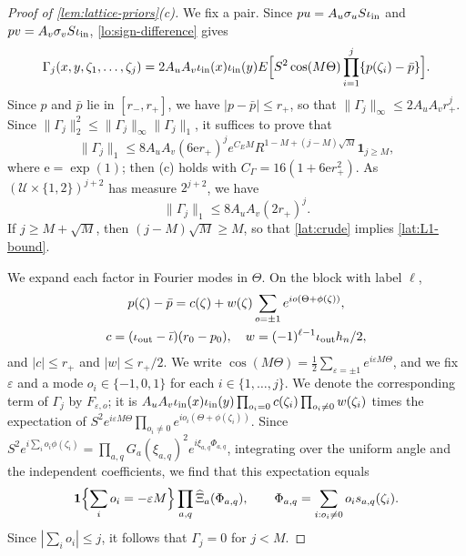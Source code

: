 \begin{proof}[Proof of \cref{lem:lattice-priors}(c)]
We fix a pair. Since $pu=A_u\sigma_uS\iota_{\rm in}$ and
$pv=A_v\sigma_vS\iota_{\rm in}$, \eqref{lo:sign-difference} gives
\[
 \Gamma_j(x,y,\zeta_1,\ldots,\zeta_j)
 =2A_uA_v\iota_{\rm in}(x)\iota_{\rm in}(y)
 E\Bigl[S^2\cos(M\Theta)\prod_{i=1}^j\{p(\zeta_i)-\bar p\}\Bigr].
\]
Since $p$ and $\bar p$ lie in $[r_-,r_+]$, we have $|p-\bar p|\le r_+$,
so that $\|\Gamma_j\|_\infty\le2A_uA_vr_+^j$. Since
$\|\Gamma_j\|_2^2\le\|\Gamma_j\|_\infty\|\Gamma_j\|_1$, it suffices to
prove that
\begin{equation}\label{lat:L1-bound}
 \|\Gamma_j\|_1\le8A_uA_v(6\mathrm er_+)^je^{C_EM}
 R^{1-M+(j-M)\sqrt M}\mathbf 1_{j\ge M},
\end{equation}
where $\mathrm e=\exp(1)$; then (c) holds with
$C_\Gamma=16(1+6\mathrm er_+^2)$. As $(\mathcal U\times\{1,2\})^{j+2}$
has measure $2^{j+2}$, we have
\begin{equation}\label{lat:crude}
 \|\Gamma_j\|_1\le8A_uA_v(2r_+)^j .
\end{equation}
If $j\ge M+\sqrt M$, then $(j-M)\sqrt M\ge M$, so that
\eqref{lat:crude} implies \eqref{lat:L1-bound}.

We expand each factor in Fourier modes in $\Theta$. On the block with
label $\ell$,
\[
 \begin{gathered}
 p(\zeta)-\bar p=c(\zeta)+w(\zeta)\sum_{o=\pm1}e^{io(\Theta+\phi(\zeta))},\\
 c=(\iota_{\rm out}-\bar\iota)(r_0-p_0),\quad
 w=(-1)^{\ell-1}\iota_{\rm out}h_n/2,
 \end{gathered}
\]
and $|c|\le r_+$ and $|w|\le r_+/2$. We write
$\cos(M\Theta)=\frac12\sum_{\varepsilon=\pm1}e^{i\varepsilon M\Theta}$,
and we fix $\varepsilon$ and a mode $o_i\in\{-1,0,1\}$ for each
$i\in\{1,\ldots,j\}$. We denote the corresponding term of $\Gamma_j$ by
$F_{\varepsilon,o}$; it is
$A_uA_v\iota_{\rm in}(x)\iota_{\rm in}(y)
\prod_{o_i=0}c(\zeta_i)\prod_{o_i\ne0}w(\zeta_i)$ times the expectation
of $S^2e^{i\varepsilon M\Theta}\prod_{o_i\ne0}e^{io_i(\Theta+\phi(\zeta_i))}$.
Since
$S^2e^{i\sum_io_i\phi(\zeta_i)}=\prod_{a,q}G_a(\xi_{a,q})^2e^{i\xi_{a,q}\Phi_{a,q}}$,
integrating over the uniform angle and the independent coefficients,
we find that this expectation equals
\begin{equation}\label{lat:alias-factor}
 \mathbf 1\Bigl\{\sum_io_i=-\varepsilon M\Bigr\}
 \prod_{a,q}\widehat\Xi_a(\Phi_{a,q}),\qquad
 \Phi_{a,q}=\sum_{i:o_i\ne0}o_is_{a,q}(\zeta_i).
\end{equation}
Since $|\sum_io_i|\le j$, it follows that $\Gamma_j=0$ for $j<M$.


\end{proof}
